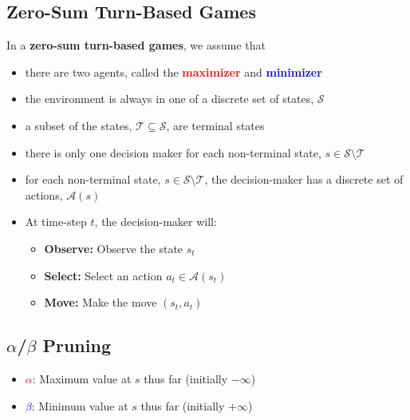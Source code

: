 \subsection{Zero-Sum Turn-Based Games}
\begin{summary}
    In a \textbf{zero-sum turn-based games}, we assume that 
    \begin{itemize}
        \item there are two agents, called the \textcolor{red}{\textbf{maximizer}} and \textcolor{blue}{\textbf{minimizer}}
        \item the environment is always in one of a discrete set of states, $\mathcal{S}$
        \item a subset of the states, $\mathcal{T} \subseteq \mathcal{S}$, are terminal states
        \item there is only one decision maker for each non-terminal state, $s \in \mathcal{S} \setminus \mathcal{T}$
        \item for each non-terminal state, $s \in \mathcal{S} \setminus \mathcal{T}$, the decision-maker has a discrete set of actions, $\mathcal{A}(s)$
        \item At time-step $t$, the decision-maker will: 
        \begin{itemize}
            \item \textbf{Observe:} Observe the state $s_t$ 
            \item \textbf{Select:} Select an action $a_t \in \mathcal{A}(s_t)$
            \item \textbf{Move:} Make the move $(s_t,a_t)$
        \end{itemize}
    \end{itemize}

\end{summary}

\subsection{$\alpha$/$\beta$ Pruning}
\begin{definition}
    \begin{itemize}
        \item \textcolor{red}{$\alpha$}: Maximum value at $s$ thus far (initially $-\infty$)
        \item \textcolor{blue}{$\beta$}: Minimum value at $s$ thus far (initially $+\infty$)
    \end{itemize}
\end{definition}

